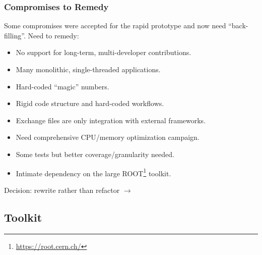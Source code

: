 \documentclass[xcolor=dvipsnames]{beamer}
\begin{document}
\begin{frame}
  \frametitle{Compromises to Remedy}

  Some compromises were accepted for the rapid prototype and now need
  ``back-filling''.  Need to remedy:

  \begin{itemize}
  \item No support for long-term, multi-developer contributions.
  \item Many monolithic, single-threaded applications.
  \item Hard-coded ``magic'' numbers.
  \item Rigid code structure and hard-coded workflows.
  \item Exchange files are only integration with external frameworks.
  \item Need comprehensive CPU/memory optimization campaign.
  \item Some tests but better coverage/granularity needed.
  \item Intimate dependency on the large
    ROOT\footnote{\url{https://root.cern.ch/}} toolkit.
  \end{itemize}

  Decision: rewrite rather than refactor $\longrightarrow$
  
\end{frame}

\subsection{Toolkit}
\end{document}

